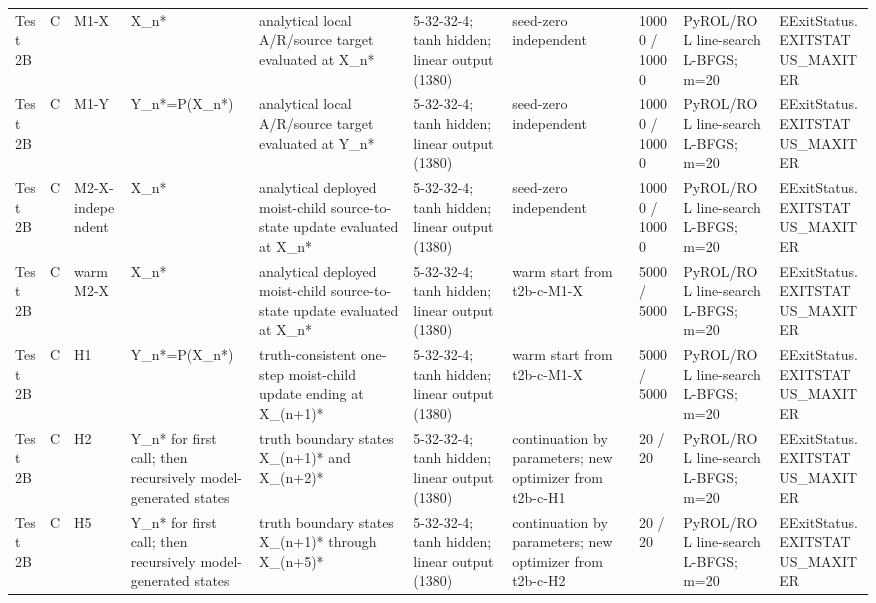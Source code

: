 \begin{tabular}{llllllllll}
Test 2B & C & M1-X & X\_n* & analytical local A/R/source target evaluated at X\_n* & 5-32-32-4; tanh hidden; linear output (1380) & seed-zero independent & 10000 / 10000 & PyROL/ROL line-search L-BFGS; m=20 & EExitStatus.EXITSTATUS\_MAXITER \\
Test 2B & C & M1-Y & Y\_n*=P(X\_n*) & analytical local A/R/source target evaluated at Y\_n* & 5-32-32-4; tanh hidden; linear output (1380) & seed-zero independent & 10000 / 10000 & PyROL/ROL line-search L-BFGS; m=20 & EExitStatus.EXITSTATUS\_MAXITER \\
Test 2B & C & M2-X-independent & X\_n* & analytical deployed moist-child source-to-state update evaluated at X\_n* & 5-32-32-4; tanh hidden; linear output (1380) & seed-zero independent & 10000 / 10000 & PyROL/ROL line-search L-BFGS; m=20 & EExitStatus.EXITSTATUS\_MAXITER \\
Test 2B & C & warm M2-X & X\_n* & analytical deployed moist-child source-to-state update evaluated at X\_n* & 5-32-32-4; tanh hidden; linear output (1380) & warm start from t2b-c-M1-X & 5000 / 5000 & PyROL/ROL line-search L-BFGS; m=20 & EExitStatus.EXITSTATUS\_MAXITER \\
Test 2B & C & H1 & Y\_n*=P(X\_n*) & truth-consistent one-step moist-child update ending at X\_(n+1)* & 5-32-32-4; tanh hidden; linear output (1380) & warm start from t2b-c-M1-X & 5000 / 5000 & PyROL/ROL line-search L-BFGS; m=20 & EExitStatus.EXITSTATUS\_MAXITER \\
Test 2B & C & H2 & Y\_n* for first call; then recursively model-generated states & truth boundary states X\_(n+1)* and X\_(n+2)* & 5-32-32-4; tanh hidden; linear output (1380) & continuation by parameters; new optimizer from t2b-c-H1 & 20 / 20 & PyROL/ROL line-search L-BFGS; m=20 & EExitStatus.EXITSTATUS\_MAXITER \\
Test 2B & C & H5 & Y\_n* for first call; then recursively model-generated states & truth boundary states X\_(n+1)* through X\_(n+5)* & 5-32-32-4; tanh hidden; linear output (1380) & continuation by parameters; new optimizer from t2b-c-H2 & 20 / 20 & PyROL/ROL line-search L-BFGS; m=20 & EExitStatus.EXITSTATUS\_MAXITER \\
\bottomrule
\end{tabular}
